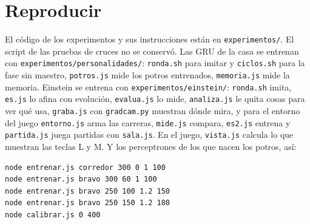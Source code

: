 \documentclass[11pt,letterpaper]{article}
\begin{document}
\section*{Reproducir}
El código de los experimentos y sus instrucciones están en \texttt{experimentos/}. El script de las pruebas de cruces no se conservó. Las GRU de la casa se entrenan con \texttt{experimentos/personalidades/}: \texttt{ronda.sh} para imitar y \texttt{ciclos.sh} para la fase sin maestro, \texttt{potros.js} mide los potros entrenados, \texttt{memoria.js} mide la memoria. Einstein se entrena con \texttt{experimentos/einstein/}: \texttt{ronda.sh} imita, \texttt{es.js} lo afina con evolución, \texttt{evalua.js} lo mide, \texttt{analiza.js} le quita cosas para ver qué usa, \texttt{graba.js} con \texttt{gradcam.py} muestran dónde mira, y para el entorno del juego \texttt{entorno.js} arma las carreras, \texttt{mide.js} compara, \texttt{es2.js} entrena y \texttt{partida.js} juega partidas con \texttt{sala.js}. En el juego, \texttt{vista.js} calcula lo que muestran las teclas L y M. Y los perceptrones de los que nacen los potros, así:
\begin{verbatim}
node entrenar.js corredor 300 0 1 100
node entrenar.js bravo 300 60 1 100
node entrenar.js bravo 250 100 1.2 150
node entrenar.js bravo 250 150 1.2 180
node calibrar.js 0 400
\end{verbatim}
\end{document}
